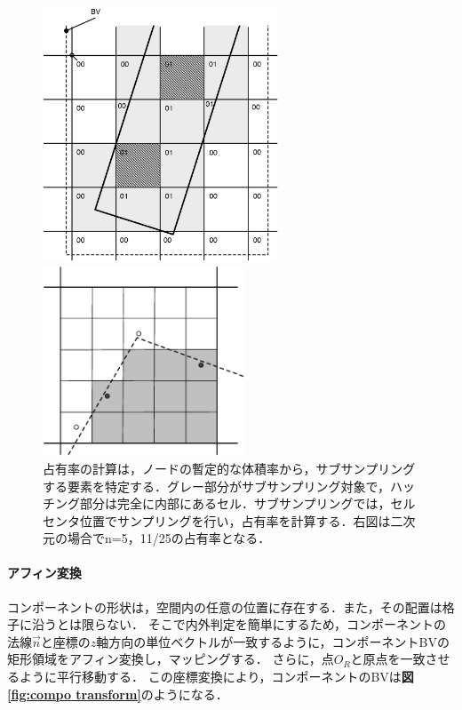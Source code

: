 \begin{figure}[htdp]
\begin{minipage}{0.5\hsize}
\begin{center}
\includegraphics[width=7cm,clip]{compo_BVH.eps}
\end{center}
\end{minipage}
\begin{minipage}{0.45\hsize}
\begin{center}
\includegraphics[width=6cm,clip]{subsampling.eps}
\end{center}
\end{minipage}
\caption{占有率の計算は，ノードの暫定的な体積率から，サブサンプリングする要素を特定する．グレー部分がサブサンプリング対象で，ハッチング部分は完全に内部にあるセル．サブサンプリングでは，セルセンタ位置でサンプリングを行い，占有率を計算する．右図は二次元の場合でn=5，11/25の占有率となる．}
\label{fig:sub-sampling}
\end{figure}

%
\paragraph{アフィン変換}
コンポーネントの形状は，空間内の任意の位置に存在する．また，その配置は格子に沿うとは限らない．
そこで内外判定を簡単にするため，コンポーネントの法線$\overrightarrow{n}$と座標の$z$軸方向の単位ベクトルが一致するように，コンポーネントBVの矩形領域をアフィン変換し，マッピングする．
さらに，点$O_R$と原点を一致させるように平行移動する．
この座標変換により，コンポーネントのBVは\textbf{図\ref{fig:compo transform}}のようになる．

